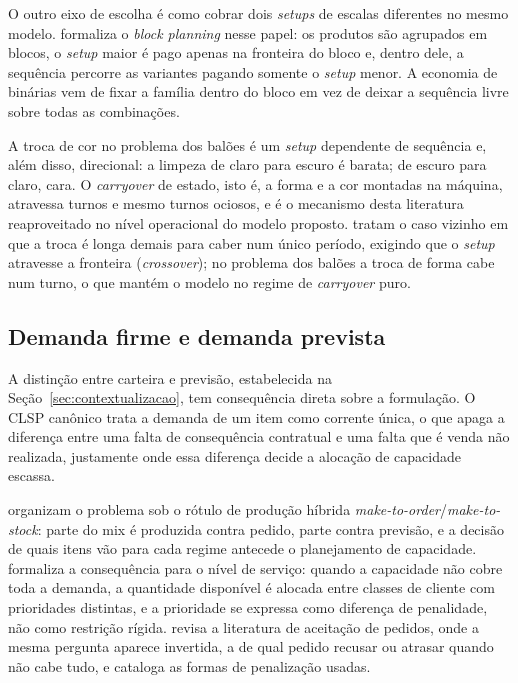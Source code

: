 \documentclass[fleqn,12pt,a4paper]{article}
\begin{document}
O outro eixo de escolha é como cobrar dois \textit{setups} de escalas diferentes no mesmo modelo.  formaliza o \textit{block planning} nesse papel: os produtos são agrupados em blocos, o \textit{setup} maior é pago apenas na fronteira do bloco e, dentro dele, a sequência percorre as variantes pagando somente o \textit{setup} menor. A economia de binárias vem de fixar a família dentro do bloco em vez de deixar a sequência livre sobre todas as combinações.

A troca de cor no problema dos balões é um \textit{setup} dependente de sequência e, além disso, direcional: a limpeza de claro para escuro é barata; de escuro para claro, cara. O \textit{carryover} de estado, isto é, a forma e a cor montadas na máquina, atravessa turnos e mesmo turnos ociosos, e é o mecanismo desta literatura reaproveitado no nível operacional do modelo proposto.  tratam o caso vizinho em que a troca é longa demais para caber num único período, exigindo que o \textit{setup} atravesse a fronteira (\textit{crossover}); no problema dos balões a troca de forma cabe num turno, o que mantém o modelo no regime de \textit{carryover} puro.

\subsection{Demanda firme e demanda prevista}

A distinção entre carteira e previsão, estabelecida na Seção~\ref{sec:contextualizacao}, tem consequência direta sobre a formulação. O CLSP canônico trata a demanda de um item como corrente única, o que apaga a diferença entre uma falta de consequência contratual e uma falta que é venda não realizada, justamente onde essa diferença decide a alocação de capacidade escassa.

 organizam o problema sob o rótulo de produção híbrida \textit{make-to-order}/\textit{make-to-stock}: parte do mix é produzida contra pedido, parte contra previsão, e a decisão de quais itens vão para cada regime antecede o planejamento de capacidade.  formaliza a consequência para o nível de serviço: quando a capacidade não cobre toda a demanda, a quantidade disponível é alocada entre classes de cliente com prioridades distintas, e a prioridade se expressa como diferença de penalidade, não como restrição rígida.  revisa a literatura de aceitação de pedidos, onde a mesma pergunta aparece invertida, a de qual pedido recusar ou atrasar quando não cabe tudo, e cataloga as formas de penalização usadas.
\end{document}
